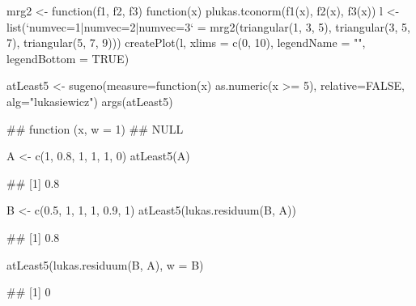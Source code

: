 \documentclass{article}\usepackage[]{graphicx}\usepackage[]{color}
\begin{document}
\begin{Schunk}
\begin{Sinput}
mrg2 <- function(f1, f2, f3) {
    function(x) {
        plukas.tconorm(f1(x), f2(x), f3(x))
    }
}
l <- list(`numvec=1|numvec=2|numvec=3` = mrg2(triangular(1, 3, 5), triangular(3, 
    5, 7), triangular(5, 7, 9)))
createPlot(l, xlims = c(0, 10), legendName = "", legendBottom = TRUE)
\end{Sinput}
\end{Schunk}

\begin{Schunk}
% --begin: "quant1"
\begin{Sinput}
atLeast5 <- sugeno(measure=function(x) as.numeric(x >= 5),
                   relative=FALSE,
                   alg="lukasiewicz")
args(atLeast5)
\end{Sinput}
\begin{Soutput}
## function (x, w = 1) 
## NULL
\end{Soutput}
%
% --end: "quant1"
\end{Schunk}

\begin{Schunk}
% --begin: "quant2"
\begin{Sinput}
A <- c(1, 0.8, 1, 1, 1, 0)
atLeast5(A)
\end{Sinput}
\begin{Soutput}
## [1] 0.8
\end{Soutput}
%
% --end: "quant2"
\end{Schunk}

\begin{Schunk}
% --begin: "quant3"
\begin{Sinput}
B <- c(0.5, 1, 1, 1, 0.9, 1)
atLeast5(lukas.residuum(B, A))
\end{Sinput}
\begin{Soutput}
## [1] 0.8
\end{Soutput}
%
% --end: "quant3"
\end{Schunk}

\begin{Schunk}
% --begin: "quant4"
\begin{Sinput}
atLeast5(lukas.residuum(B, A), w = B)
\end{Sinput}
\begin{Soutput}
## [1] 0
\end{Soutput}
%
% --end: "quant4"
\end{Schunk}
\end{document}
